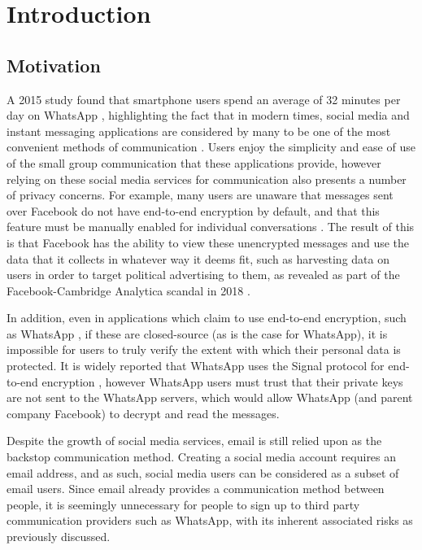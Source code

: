 \chapter{Introduction}


\section{Motivation}

A 2015 study found that smartphone users spend an average of 32 minutes per day on WhatsApp \cite{montag2015}, highlighting the fact that in modern times, social media and instant messaging applications are considered by many to be one of the most convenient methods of communication \cite{church2013}. Users enjoy the simplicity and ease of use of the small group communication that these applications provide, however relying on these social media services for communication also presents a number of privacy concerns. For example, many users are unaware that messages sent over Facebook do not have end-to-end encryption by default, and that this feature must be manually enabled for individual conversations \cite{facebook2017}. The result of this is that Facebook has the ability to view these unencrypted messages and use the data that it collects in whatever way it deems fit, such as harvesting data on users in order to target political advertising to them, as revealed as part of the Facebook-Cambridge Analytica scandal in 2018 \cite{guardian2018}.

In addition, even in applications which claim to use end-to-end encryption, such as WhatsApp \cite{whatsapp2017}, if these are closed-source (as is the case for WhatsApp), it is impossible for users to truly verify the extent with which their personal data is protected. It is widely reported that WhatsApp uses the Signal protocol for end-to-end encryption \cite{whatsapp2017}, however WhatsApp users must trust that their private keys are not sent to the WhatsApp servers, which would allow WhatsApp (and parent company Facebook) to decrypt and read the messages.

Despite the growth of social media services, email is still relied upon as the backstop communication method. Creating a social media account requires an email address, and as such, social media users can be considered as a subset of email users. Since email already provides a communication method between people, it is seemingly unnecessary for people to sign up to third party communication providers such as WhatsApp, with its inherent associated risks as previously discussed.

